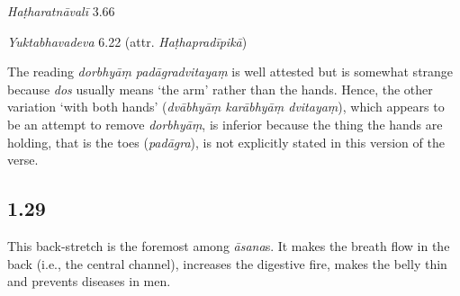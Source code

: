 \begin{ekdosis}
\begin{testimonia}[hp01_028]
\begin{versinnote}
\end{versinnote}

\emph{Haṭharatnāvalī} 3.66

\begin{versinnote}
\tl{\var{dorbhyāṃ padāgradvitayaṃ ] dvābhyāṃ karābhyāṃ dvitayaṃ n1,n3}\\!}
\end{versinnote}

\emph{Yuktabhavadeva} 6.22 (attr. \emph{Haṭhapradīpikā})

\begin{versinnote}
\end{versinnote}

\end{testimonia}

\begin{philcomm}[hp01_028]
The reading \emph{dorbhyāṃ padāgradvitayaṃ} is well attested but is somewhat strange because \emph{dos} usually means `the arm' rather than the hands. Hence, the other variation `with both hands' (\emph{dvābhyāṃ karābhyāṃ dvitayaṃ}), which appears to be an attempt to remove \emph{dorbhyāṃ}, is inferior because the thing the hands are holding, that is the toes (\emph{padāgra}), is not explicitly stated in this version of the verse.
\end{philcomm}

\subsection*{1.29}
\begin{translation}[hp01_029]
This back-stretch is the foremost among \emph{āsana}s. It makes the breath flow in the back (i.e., the central channel), increases the digestive fire, makes the belly thin and prevents diseases in men.
\end{translation}


\end{ekdosis}
